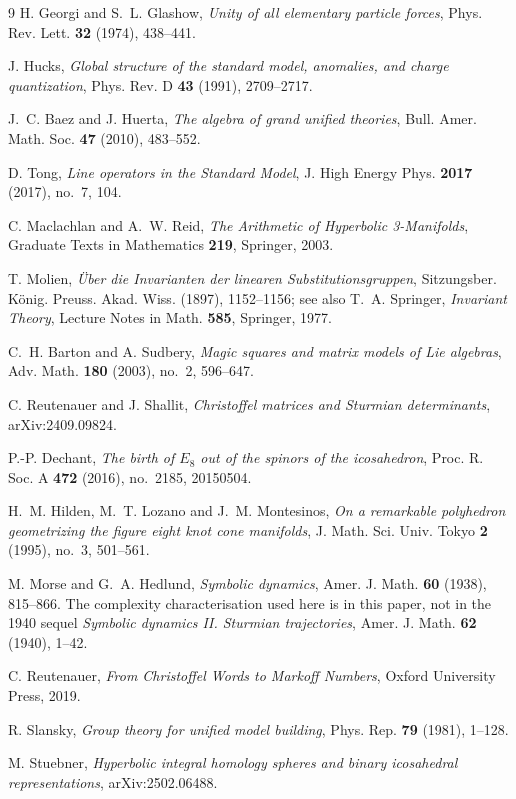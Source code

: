 \documentclass[11pt,reqno]{amsart}
\theoremstyle{plain}
\theoremstyle{definition}
\theoremstyle{remark}
\begin{document}
\begin{thebibliography}{9}
 H. Georgi and S.~L. Glashow, \emph{Unity of all elementary
  particle forces}, Phys. Rev. Lett. \textbf{32} (1974), 438--441.

 J. Hucks, \emph{Global structure of the standard model, anomalies, and
  charge quantization}, Phys. Rev. D \textbf{43} (1991), 2709--2717.

 J.~C. Baez and J. Huerta, \emph{The algebra of grand unified
  theories}, Bull. Amer. Math. Soc. \textbf{47} (2010), 483--552.

 D. Tong, \emph{Line operators in the Standard Model}, J. High Energy
  Phys. \textbf{2017} (2017), no.~7, 104.

 C. Maclachlan and A.~W. Reid, \emph{The Arithmetic of
Hyperbolic 3-Manifolds}, Graduate Texts in Mathematics \textbf{219}, Springer, 2003.

 T. Molien, \emph{\"Uber die Invarianten der linearen
Substitutionsgruppen}, Sitzungsber. K\"onig. Preuss. Akad. Wiss. (1897), 1152--1156;
see also T.~A. Springer, \emph{Invariant Theory}, Lecture Notes in Math. \textbf{585},
Springer, 1977.

 C.~H. Barton and A. Sudbery, \emph{Magic squares and matrix
models of Lie algebras}, Adv. Math. \textbf{180} (2003), no.~2, 596--647.

 C. Reutenauer and J. Shallit, \emph{Christoffel matrices
and Sturmian determinants}, arXiv:2409.09824.

 P.-P. Dechant, \emph{The birth of $E_8$ out of the spinors of the
icosahedron}, Proc. R. Soc. A \textbf{472} (2016), no.~2185, 20150504.

 H.~M. Hilden, M.~T. Lozano and J.~M. Montesinos, \emph{On a remarkable
polyhedron geometrizing the figure eight knot cone manifolds}, J. Math. Sci. Univ.
Tokyo \textbf{2} (1995), no.~3, 501--561.

 M. Morse and G.~A. Hedlund, \emph{Symbolic dynamics},
  Amer. J. Math. \textbf{60} (1938), 815--866. The complexity characterisation used here
  is in this paper, not in the 1940 sequel \emph{Symbolic dynamics II. Sturmian
  trajectories}, Amer. J. Math. \textbf{62} (1940), 1--42.

 C. Reutenauer, \emph{From Christoffel Words to Markoff Numbers},
Oxford University Press, 2019.

 R. Slansky, \emph{Group theory for unified model building}, Phys. Rep.
\textbf{79} (1981), 1--128.

 M. Stuebner, \emph{Hyperbolic integral homology spheres and binary
icosahedral representations}, arXiv:2502.06488.

\end{thebibliography}
\end{document}
